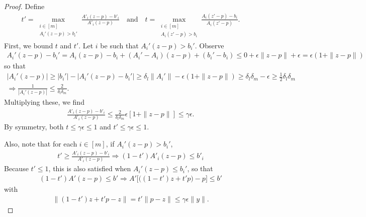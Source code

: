 \documentclass{article}
\theoremstyle{case}
\numberwithin{theorem}{subsection}
\begin{document}
\begin{proof}
Define
\begin{align*}
t' = \max_{\substack{i \in [m] \\ A_i'(z - p) > b_i'}} \frac{A'_i (z - p) - b'_i}{A'_i (z - p)}
\quad \textrm{and} \quad
t = \max_{\substack{i \in [m] \\ A_i(z' - p) > b_i}} \frac{A_i (z' - p) - b_i}{A_i (z' - p)}.
\end{align*}
First, we bound $t$ and $t'$.
Let $i$ be such that $A_i'(z - p) > b_i'$.
Observe
\begin{align*}
A_i'(z - p) - b_i' 
= A_i(z - p) - b_i + (A_i' - A_i)(z - p) + (b_i' - b_i)
\le 0 + \epsilon \|z - p\| + \epsilon = \epsilon (1 + \|z - p\|)
\end{align*}
so that
\begin{align*}
\left|A_i'(z - p)\right| \ge |b_i'| - \left| A_i'(z - p) - b_i'\right| \ge \delta_l\|A_i'\| - \epsilon (1 + \|z - p\|) \ge \delta_l \delta_m - \epsilon \ge \frac 1 2 \delta_l \delta_m\\
\Longrightarrow \frac 1 {\left|A_i'(z - p)\right|} \le \frac 2 {\delta_l \delta_m}.
\end{align*}
Multiplying these, we find
\begin{align*}
\frac{A'_i (z - p) - b'_i}{A'_i (z - p)} \le \frac{2}{\delta_l \delta_m}\epsilon \left[1 + \|z - p\|\right] \le \gamma \epsilon.
\end{align*}
By symmetry, both
$
t \le \gamma \epsilon \le 1
$ and $
t' \le \gamma \epsilon \le 1.
$



Also, note that for each $i \in [m]$, if $A_i'(z - p) > b_i'$,
\begin{align*}
t' \ge \frac{A'_i (z - p) - b'_i}{A'_i (z - p)}
\Longrightarrow (1-t') A'_i (z - p) \le b'_i
\end{align*}
Because $t' \le 1$, this is also satisfied when $A_i'(z - p) \le b_i'$, 
so that 
\begin{align*}
(1-t') A' (z - p) \le b'
\Longrightarrow
A' \bigg[\big((1-t') z + t'p\big) - p\bigg] \le b'
\end{align*}
with
\begin{align*}
\|(1-t') z + t'p - z\| = t' \|p - z\| \le \gamma \epsilon \|y\|.
\end{align*}


\end{proof}
\end{document}
